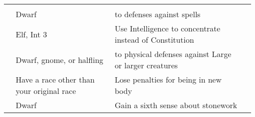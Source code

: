 \begin{longtabuwrapper}
\begin{longtabu}{>{\lcol}p{10em} >{\lcol}p{15em} >{\lcol}X >{\lcol}p{3em}}
        \midrule
         &  &  &  \\
         & Dwarf &  to defenses against spells &  \\
         & Elf, Int 3 & Use Intelligence to concentrate instead of Constitution &  \\
         & Dwarf, gnome, or halfling &  to physical defenses against Large or larger creatures &  \\
         & Have a race other than your original race & Lose penalties for being in new body &  \\
         & Dwarf & Gain a sixth sense about stonework &  \\


\end{longtabu}
\end{longtabuwrapper}

